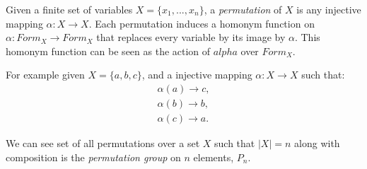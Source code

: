     
\begin{definition}[Permutation]
    Given a finite set of variables $X = \{x_1,...,x_n\}$, a \emph{permutation} of $X$ is any injective mapping $\alpha:X \to X$. Each permutation induces a homonym function on $\alpha: Form_X \to Form_X$  that replaces every variable by its image by $\alpha$. This homonym function can be seen as the action of $alpha$ over $Form_X$.
\end{definition}

      For example given $X = \{a,b,c\}$, and a injective mapping $\alpha:X\to X$ such that: 
  \begin{equation}
     \begin{split}
       \alpha(a) \to c,\\
       \alpha(b) \to b,\\
       \alpha(c) \to a.
     \end{split}
 \end{equation}

 We can see set of all permutations over a set $X$ such that $|X|=n$ along with composition is the \emph{permutation group} on $n$ elements, $P_n$.\\

